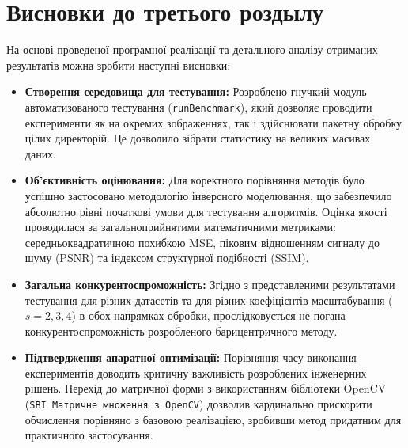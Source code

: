 \section*{Висновки до третього роздылу}

На основі проведеної програмної реалізації та детального аналізу отриманих результатів можна зробити наступні висновки:

\begin{itemize}
	\item \textbf{Створення середовища для тестування:} Розроблено гнучкий модуль автоматизованого тестування (\texttt{runBenchmark}), який дозволяє проводити експерименти як на окремих зображеннях, так і здійснювати пакетну обробку цілих директорій. Це дозволило зібрати статистику на великих масивах даних.
	
	\item \textbf{Об'єктивність оцінювання:} Для коректного порівняння методів було успішно застосовано методологію інверсного моделювання, що забезпечило абсолютно рівні початкові умови для тестування алгоритмів. Оцінка якості проводилася за загальноприйнятими математичними метриками: середньоквадратичною похибкою MSE, піковим відношенням сигналу до шуму (PSNR) та індексом структурної подібності (SSIM).
	
	\item \textbf{Загальна конкурентоспроможність:} Згідно з представленими результатами тестування для різних датасетів та для різних коефіцієнтів масштабування ($s=2, 3, 4$) в обох напрямках обробки, прослідковується не погана конкурентоспроможність розробленого барицентричного методу.
	
	\item \textbf{Підтвердження апаратної оптимізації:} Порівняння часу виконання експериментів доводить критичну важливість розроблених інженерних рішень. Перехід до матричної форми з використанням бібліотеки OpenCV (\texttt{SBI Матричне множення з OpenCV}) дозволив кардинально прискорити обчислення порівняно з базовою реалізацією, зробивши метод придатним для практичного застосування.
\end{itemize}